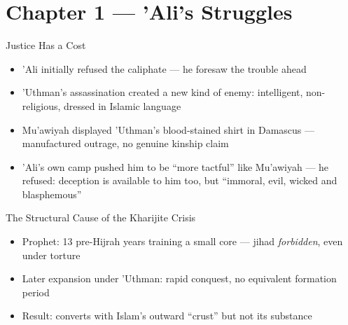 \section{Chapter 1 — 'Ali's Struggles}


\begin{frame}{Justice Has a Cost}
\begin{itemize}[itemsep=5pt]
  \item 'Ali initially refused the caliphate --- he foresaw the trouble ahead
  \item 'Uthman's assassination created a new kind of enemy: intelligent, non-religious, dressed in Islamic language
  \item Mu'awiyah displayed 'Uthman's blood-stained shirt in Damascus --- manufactured outrage, no genuine kinship claim
  \item 'Ali's own camp pushed him to be ``more tactful'' like Mu'awiyah --- he refused: deception is available to him too, but ``immoral, evil, wicked and blasphemous''
\end{itemize}
\end{frame}

\begin{frame}{The Structural Cause of the Kharijite Crisis}
\begin{itemize}[itemsep=5pt]
  \item Prophet: 13 pre-Hijrah years training a small core --- jihad \emph{forbidden}, even under torture
  \item Later expansion under 'Uthman: rapid conquest, no equivalent formation period
  \item Result: converts with Islam's outward ``crust'' but not its substance
\end{itemize}
\end{frame}

